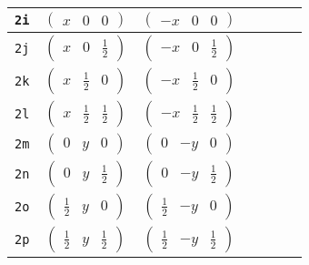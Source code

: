 \documentclass[fleqn,9pt,landscape]{jsarticle}
\begin{document}
\begin{center}
\begin{longtable}{ccccccc}
{\tt 2i} & $ \begin{pmatrix} x & 0 & 0 \end{pmatrix} $ & $ \begin{pmatrix} - x & 0 & 0 \end{pmatrix} $ & $  $ & $  $ & $  $ & $  $ \\ \hline
{\tt 2j} & $ \begin{pmatrix} x & 0 & \frac{1}{2} \end{pmatrix} $ & $ \begin{pmatrix} - x & 0 & \frac{1}{2} \end{pmatrix} $ & $  $ & $  $ & $  $ & $  $ \\ \hline
{\tt 2k} & $ \begin{pmatrix} x & \frac{1}{2} & 0 \end{pmatrix} $ & $ \begin{pmatrix} - x & \frac{1}{2} & 0 \end{pmatrix} $ & $  $ & $  $ & $  $ & $  $ \\ \hline
{\tt 2l} & $ \begin{pmatrix} x & \frac{1}{2} & \frac{1}{2} \end{pmatrix} $ & $ \begin{pmatrix} - x & \frac{1}{2} & \frac{1}{2} \end{pmatrix} $ & $  $ & $  $ & $  $ & $  $ \\ \hline
{\tt 2m} & $ \begin{pmatrix} 0 & y & 0 \end{pmatrix} $ & $ \begin{pmatrix} 0 & - y & 0 \end{pmatrix} $ & $  $ & $  $ & $  $ & $  $ \\ \hline
{\tt 2n} & $ \begin{pmatrix} 0 & y & \frac{1}{2} \end{pmatrix} $ & $ \begin{pmatrix} 0 & - y & \frac{1}{2} \end{pmatrix} $ & $  $ & $  $ & $  $ & $  $ \\ \hline
{\tt 2o} & $ \begin{pmatrix} \frac{1}{2} & y & 0 \end{pmatrix} $ & $ \begin{pmatrix} \frac{1}{2} & - y & 0 \end{pmatrix} $ & $  $ & $  $ & $  $ & $  $ \\ \hline
{\tt 2p} & $ \begin{pmatrix} \frac{1}{2} & y & \frac{1}{2} \end{pmatrix} $ & $ \begin{pmatrix} \frac{1}{2} & - y & \frac{1}{2} \end{pmatrix} $ & $  $ & $  $ & $  $ & $  $ \\ \hline

\end{longtable}
\end{center}
\end{document}
